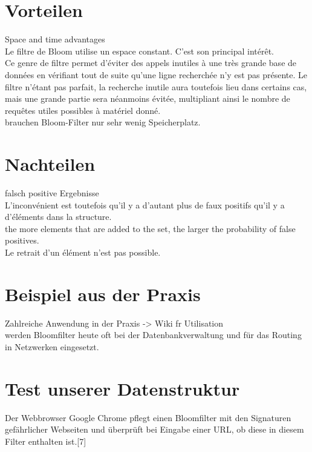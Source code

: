 \documentclass[12pt, letterpaper]{article}
\begin{document}
\section{Vorteilen}

Space and time advantages\\
Le filtre de Bloom utilise un espace constant. C'est son principal intérêt.\\
Ce genre de filtre permet d'éviter des appels inutiles à une très grande base de données en vérifiant tout de suite qu'une ligne recherchée n'y est pas présente. Le filtre n'étant pas parfait, la recherche inutile aura toutefois lieu dans certains cas, mais une grande partie sera néanmoins évitée, multipliant ainsi le nombre de requêtes utiles possibles à matériel donné.\\
brauchen Bloom-Filter nur sehr wenig Speicherplatz.\\

\section{Nachteilen}

falsch positive Ergebnisse\\
L'inconvénient est toutefois qu'il y a d'autant plus de faux positifs qu'il y a d'éléments dans la structure.\\
the more elements that are added to the set, the larger the probability of false positives.\\
Le retrait d'un élément n'est pas possible.\\

\section{Beispiel aus der Praxis}

Zahlreiche Anwendung in der Praxis -> Wiki fr Utilisation\\
werden Bloomfilter heute oft bei der Datenbankverwaltung und für das Routing in Netzwerken eingesetzt.\\

\section{Test unserer Datenstruktur}

Der Webbrowser Google Chrome pflegt einen Bloomfilter mit den Signaturen gefährlicher Webseiten und überprüft bei Eingabe einer URL, ob diese in diesem Filter enthalten ist.[7]
\end{document}
